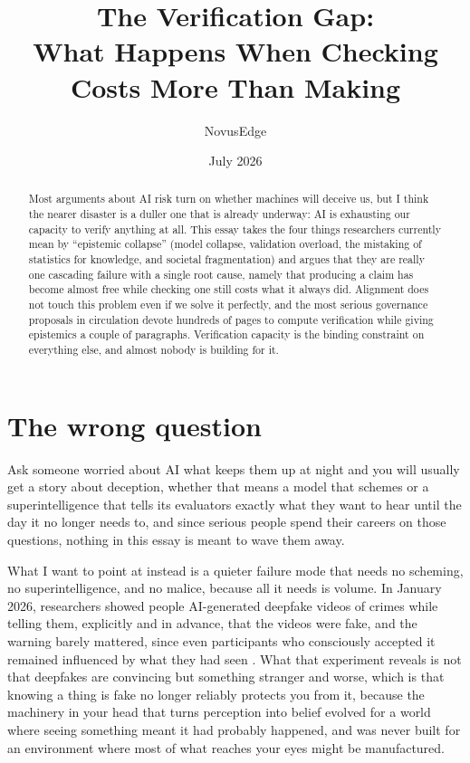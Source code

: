 \documentclass[11pt,letterpaper]{article}
\title{The Verification Gap:\\What Happens When Checking Costs More Than Making}
\author{NovusEdge}
\date{July 2026}
\begin{document}
\maketitle

\begin{abstract}
\noindent Most arguments about AI risk turn on whether machines will deceive us, but I think the nearer disaster is a duller one that is already underway: AI is exhausting our capacity to verify anything at all. This essay takes the four things researchers currently mean by ``epistemic collapse'' (model collapse, validation overload, the mistaking of statistics for knowledge, and societal fragmentation) and argues that they are really one cascading failure with a single root cause, namely that producing a claim has become almost free while checking one still costs what it always did. Alignment does not touch this problem even if we solve it perfectly, and the most serious governance proposals in circulation devote hundreds of pages to compute verification while giving epistemics a couple of paragraphs. Verification capacity is the binding constraint on everything else, and almost nobody is building for it.
\end{abstract}

\section{The wrong question}

Ask someone worried about AI what keeps them up at night and you will usually get a story about deception, whether that means a model that schemes or a superintelligence that tells its evaluators exactly what they want to hear until the day it no longer needs to, and since serious people spend their careers on those questions, nothing in this essay is meant to wave them away.

What I want to point at instead is a quieter failure mode that needs no scheming, no superintelligence, and no malice, because all it needs is volume. In January 2026, researchers showed people AI-generated deepfake videos of crimes while telling them, explicitly and in advance, that the videos were fake, and the warning barely mattered, since even participants who consciously accepted it remained influenced by what they had seen \citep{misinfo-case}. What that experiment reveals is not that deepfakes are convincing but something stranger and worse, which is that knowing a thing is fake no longer reliably protects you from it, because the machinery in your head that turns perception into belief evolved for a world where seeing something meant it had probably happened, and was never built for an environment where most of what reaches your eyes might be manufactured.
\end{document}
